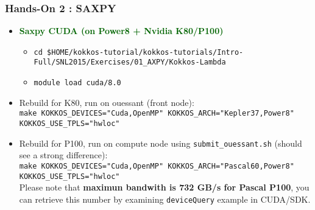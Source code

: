 \begin{frame}[fragile=singleslide]
  \frametitle{Hands-On 2 : SAXPY}

  \begin{itemize}
  \item \textcolor{darkgreen}{\textbf{Saxpy CUDA (on Power8 + Nvidia K80/P100)}}
    \begin{itemize}
    \item \texttt{cd \$HOME/kokkos-tutorial/kokkos-tutorials/Intro-Full/SNL2015/Exercises/01\_AXPY/Kokkos-Lambda}
    \item \texttt{module load cuda/8.0}
    \end{itemize}
  \item Rebuild for K80, run on ouessant (front node):\\
    \texttt{make KOKKOS\_DEVICES="Cuda,OpenMP" KOKKOS\_ARCH="Kepler37,Power8" KOKKOS\_USE\_TPLS="hwloc"}
  \item Rebuild for P100, run on compute node using \texttt{submit\_ouessant.sh} (should see a strong difference):\\
    \texttt{make KOKKOS\_DEVICES="Cuda,OpenMP" KOKKOS\_ARCH="Pascal60,Power8" KOKKOS\_USE\_TPLS="hwloc"}\\
    Please note that \textbf{maximun bandwith is 732 GB/s for Pascal P100}, you can retrieve this number by examining \texttt{deviceQuery} example in CUDA/SDK.
  \end{itemize}
\end{frame}

